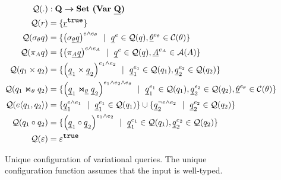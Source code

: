 \begin{figure}
\begin{alignat*}{1}
\qGroup . &: \qSet \totype \settype {\bm{(} \vartype \pQSet \bm{)}}\\
%
\qGroup \vRel &= \setDef {\annot [\t] \pRel}\\
\qGroup {\vSel \vQ}  &=  
\setDef {\annot [\dimMeta \wedge \dimMeta_\vCond] {\left(\sigma_{\pCond} \pQ\right)} \myOR
\annot \pQ \in \qGroup \vQ, \annot [\dimMeta_\vCond] \pCond \in \cGroup}
\\
%
\qGroup {\vPrj [\vAttList] \vQ} &= 
\setDef {\annot [\dimMeta \wedge \dimMeta_\vAttList] {\left(\pi_{\pAttList} \pQ \right)} \myOR
\annot \pQ \in \qGroup \vQ, \annot [\dimMeta_\vAttList] \pAttList \in \aGroup}
\\
%
\qGroup {{\vQ_1} \times {\vQ_2}} &= 
\setDef {\annot [\dimMeta_1 \wedge \dimMeta_2] {\left(\pQ_1 \times \pQ_2\right)} \myOR
\annot [\dimMeta_1] \pQ_1 \in \qGroup {\vQ_1}, \annot [\dimMeta_2] \pQ_2 \in \qGroup {\vQ_2} }
\\
%
\qGroup {{\vQ_1} \Join_\vCond {\vQ_2}} &= 
\setDef {\annot [\dimMeta_1 \wedge \dimMeta_2 \wedge \dimMeta_\vCond] {\left(\pQ_1 \Join_{\pCond} \pQ_2 \right)} \myOR 
\annot [\dimMeta_1] \pQ_1 \in \qGroup {\vQ_1}, \annot [\dimMeta_2] \pQ_2 \in \qGroup {\vQ_2}
,\annot [\dimMeta_\vCond] \pCond \in \cGroup  }
\\
%
\qGroup {\chc {\vQ_1, \vQ_2}} &= 
\setDef {\annot [\dimMeta \wedge \dimMeta_1] \pQ_1 \myOR  \annot [\dimMeta_1] \pQ_1 \in \qGroup {\vQ_1} }
\cup 
\setDef {\annot [\neg \dimMeta \wedge \dimMeta_2] \pQ_2 \myOR  \annot [\dimMeta_2] \pQ_2 \in \qGroup {\vQ_2}}  \\
%
\qGroup {{\vQ_1} \circ {\vQ_2}} &= 
\setDef {\annot [\dimMeta_1 \wedge \dimMeta_2] {\left(\pQ_1 \circ \pQ_2\right)} \myOR
\annot [\dimMeta_1] \pQ_1 \in \qGroup {\vQ_1}, \annot [\dimMeta_2] \pQ_2 \in \qGroup {\vQ_2} }\\
%
\qGroup {\empRel} &= \annot [\t] { \empRel}
\end{alignat*}
\caption[Unique configuration of variational queries]{Unique configuration of variational queries. 
The unique configuration function assumes that the input is well-typed.
}
\label{fig:vq-group}
\end{figure}

